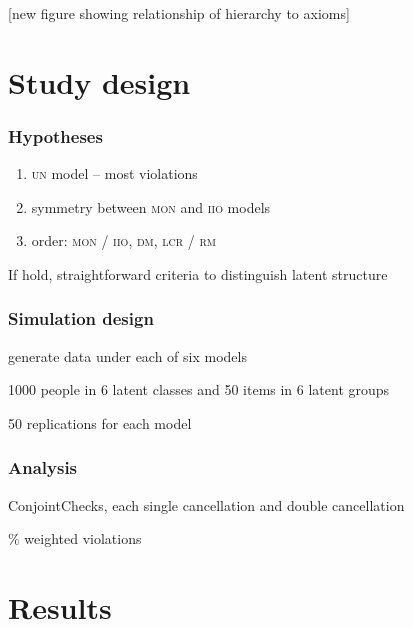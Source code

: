 \documentclass[10pt,serif,professionalfont]{beamer}
\begin{document}
\begin{frame}
    \frametitle{}

    [new figure showing relationship of hierarchy to axioms]

\end{frame}

\begin{frame}
    \frametitle{}

\end{frame}


\section{Study design}

\begin{frame}
    \frametitle{Hypotheses}
    
    \begin{enumerate}
    \item \textsc{un} model -- most violations
    \item symmetry between \textsc{mon} and \textsc{iio} models
    \item order: \textsc{mon} / \textsc{iio}, \textsc{dm}, \textsc{lcr} / \textsc{rm}
    \end{enumerate}
    
    
    If hold, straightforward criteria to distinguish latent structure 

\end{frame}

\begin{frame}
    \frametitle{Simulation design}

    generate data under each of six models
    
    1000 people in 6 latent classes and 50 items in 6 latent groups
    
    50 replications for each model

\end{frame}

\begin{frame}
    \frametitle{Analysis}

    ConjointChecks, each single cancellation and double cancellation
    
    \% weighted violations

\end{frame}


\section{Results}
\end{document}
